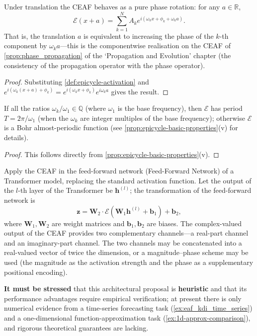 \begin{proposition}\label{prop:ceaf_propagation}
Under translation the CEAF behaves as a pure phase rotation: for any $a\in\mathbb{R}$,
\[
\mathcal{E}(x+a) = \sum_{k=1}^{N}A_k e^{i(\omega_k x+\phi_k+\omega_k a)}.
\]
That is, the translation $a$ is equivalent to increasing the phase of the $k$-th component by $\omega_k a$---this is the componentwise realisation on the CEAF of \cref{prop:phase_propagation} of the `Propagation and Evolution' chapter (the consistency of the propagation operator with the phase operator).
\end{proposition}

\begin{proof}
Substituting \cref{def:epicycle-activation} and $e^{i(\omega_k(x+a)+\phi_k)} = e^{i(\omega_k x+\phi_k)}e^{i\omega_k a}$ gives the result.
\end{proof}

\begin{corollary}\label{cor:ceaf_period_agent}
If all the ratios $\omega_k/\omega_1 \in \mathbb{Q}$ (where $\omega_1$ is the base frequency), then $\mathcal{E}$ has period $T = 2\pi/\omega_1$ (when the $\omega_k$ are integer multiples of the base frequency); otherwise $\mathcal{E}$ is a Bohr almost-periodic function (see \cref{prop:epicycle-basic-properties}(v) for details).
\end{corollary}

\begin{proof}
This follows directly from \cref{prop:epicycle-basic-properties}(v).
\end{proof}

\begin{remark}\label{prop:eaf_transformer}
Apply the CEAF in the feed-forward network (Feed-Forward Network) of a Transformer model, replacing the standard activation function. Let the output of the $l$-th layer of the Transformer be $\mathbf{h}^{(l)}$; the transformation of the feed-forward network is
\[
\mathbf{z} = \mathbf{W}_2 \cdot \mathcal{E}(\mathbf{W}_1 \mathbf{h}^{(l)} + \mathbf{b}_1) + \mathbf{b}_2,
\]
where $\mathbf{W}_1, \mathbf{W}_2$ are weight matrices and $\mathbf{b}_1, \mathbf{b}_2$ are biases. The complex-valued output of the CEAF provides two complementary channels---a real-part channel and an imaginary-part channel. The two channels may be concatenated into a real-valued vector of twice the dimension, or a magnitude--phase scheme may be used (the magnitude as the activation strength and the phase as a supplementary positional encoding).

\textbf{It must be stressed} that this architectural proposal is \textbf{heuristic} and that its performance advantages require empirical verification; at present there is only numerical evidence from a time-series forecasting task (\cref{ex:eaf_kdi_time_series}) and a one-dimensional function-approximation task (\cref{ex:1d-approx-comparison}), and rigorous theoretical guarantees are lacking.
\end{remark}

